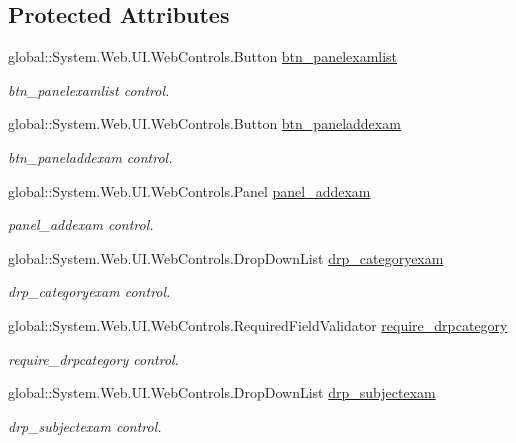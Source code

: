 \subsection*{Protected Attributes}
\begin{DoxyCompactItemize}
\item 
global\+::\+System.\+Web.\+U\+I.\+Web\+Controls.\+Button \mbox{\hyperlink{class_admin__exam_ac66e3bc3f4108eb9214750aac4211e01}{btn\+\_\+panelexamlist}}
\begin{DoxyCompactList}\small\item\em btn\+\_\+panelexamlist control. \end{DoxyCompactList}\item 
global\+::\+System.\+Web.\+U\+I.\+Web\+Controls.\+Button \mbox{\hyperlink{class_admin__exam_a5d211fe1012dbc560c16df154d50c640}{btn\+\_\+paneladdexam}}
\begin{DoxyCompactList}\small\item\em btn\+\_\+paneladdexam control. \end{DoxyCompactList}\item 
global\+::\+System.\+Web.\+U\+I.\+Web\+Controls.\+Panel \mbox{\hyperlink{class_admin__exam_a4c768832676de770420b68f8a3bd0764}{panel\+\_\+addexam}}
\begin{DoxyCompactList}\small\item\em panel\+\_\+addexam control. \end{DoxyCompactList}\item 
global\+::\+System.\+Web.\+U\+I.\+Web\+Controls.\+Drop\+Down\+List \mbox{\hyperlink{class_admin__exam_ac20ec0f627753b6300bc1c7057dd36d8}{drp\+\_\+categoryexam}}
\begin{DoxyCompactList}\small\item\em drp\+\_\+categoryexam control. \end{DoxyCompactList}\item 
global\+::\+System.\+Web.\+U\+I.\+Web\+Controls.\+Required\+Field\+Validator \mbox{\hyperlink{class_admin__exam_a7fe603aaebc33d743aa241a023689e62}{require\+\_\+drpcategory}}
\begin{DoxyCompactList}\small\item\em require\+\_\+drpcategory control. \end{DoxyCompactList}\item 
global\+::\+System.\+Web.\+U\+I.\+Web\+Controls.\+Drop\+Down\+List \mbox{\hyperlink{class_admin__exam_a355ee23e9f8e6b131a36d5a7129a6f5c}{drp\+\_\+subjectexam}}
\begin{DoxyCompactList}\small\item\em drp\+\_\+subjectexam control. \end{DoxyCompactList}\item 

\end{DoxyCompactItemize}
